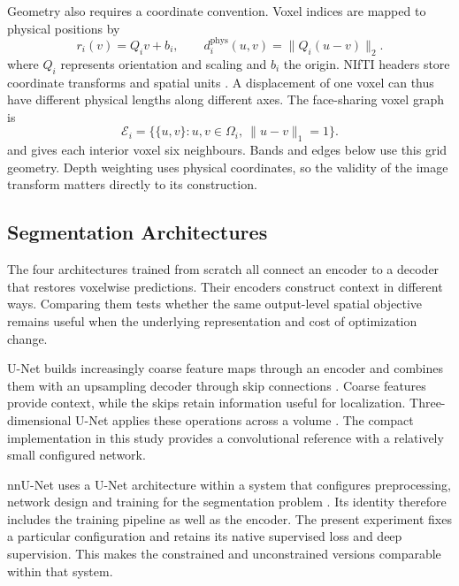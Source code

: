 \documentclass[12pt,a4paper]{article}
\begin{document}
Geometry also requires a coordinate convention. Voxel indices are mapped
to physical positions by
\begin{equation}
r_i(v)=Q_i v+b_i,
\qquad
d_i^{\mathrm{phys}}(u,v)=\lVert Q_i(u-v)\rVert_2.
\label{eq:physical-coordinates}
\end{equation}
where $Q_i$ represents orientation and scaling and $b_i$ the origin.
NIfTI headers store coordinate transforms and spatial units
\cite{nifti1fields}. A displacement of one voxel can thus have different
physical lengths along different axes. The face-sharing voxel graph is
\begin{equation}
\mathcal{E}_i=\{\{u,v\}:u,v\in\Omega_i,\ \lVert u-v\rVert_1=1\}.
\label{eq:voxel-neighbourhood}
\end{equation}
and gives each interior voxel six neighbours. Bands and edges below use
this grid geometry. Depth weighting uses physical coordinates, so the
validity of the image transform matters directly to its construction.

\subsection{Segmentation Architectures}\label{sec:segmentation-architectures}

The four architectures trained from scratch all connect an encoder to a
decoder that restores voxelwise predictions. Their encoders construct
context in different ways. Comparing them tests whether the same
output-level spatial objective remains useful when the underlying
representation and cost of optimization change.

U-Net builds increasingly coarse feature maps through an encoder and
combines them with an upsampling decoder through skip connections
\cite{ronneberger2015unet}. Coarse features provide context, while the
skips retain information useful for localization. Three-dimensional
U-Net applies these operations across a volume \cite{cicek2016unet}.
The compact implementation in this study provides a convolutional
reference with a relatively small configured network.

nnU-Net uses a U-Net architecture within a system that configures
preprocessing, network design and training for the segmentation problem
\cite{isensee2021nnunet}. Its identity therefore includes the training
pipeline as well as the encoder. The present experiment fixes a particular
configuration and retains its native supervised loss and deep supervision.
This makes the constrained and unconstrained versions comparable within
that system.
\end{document}
